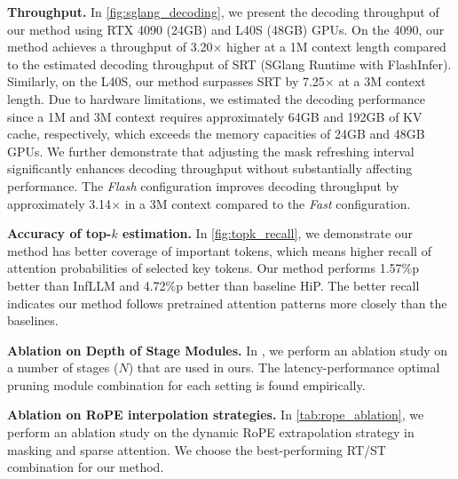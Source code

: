 \textbf{Throughput.} In \cref{fig:sglang_decoding}, we present the decoding throughput of our method using RTX 4090 (24GB) and L40S (48GB) GPUs. On the 4090, our method achieves a throughput of 3.20$\times$ higher at a 1M context length compared to the estimated decoding throughput of SRT (SGlang Runtime with FlashInfer). Similarly, on the L40S, our method surpasses SRT by 7.25$\times$ at a 3M context length.
Due to hardware limitations, we estimated the decoding performance since a 1M and 3M context requires approximately 64GB and 192GB of KV cache, respectively, which exceeds the memory capacities of 24GB and 48GB GPUs.
We further demonstrate that adjusting the mask refreshing interval significantly enhances decoding throughput without substantially affecting performance. The \textit{Flash} configuration improves decoding throughput by approximately 3.14$\times$ in a 3M context compared to the \textit{Fast} configuration.


\textbf{Accuracy of top-$k$ estimation.}
In \cref{fig:topk_recall}, we demonstrate our method has better coverage of important tokens, which means higher recall of attention probabilities of selected key tokens. 
Our method performs 1.57\%p better than InfLLM and 4.72\%p better than baseline HiP.
The better recall indicates our method follows pretrained attention patterns more closely than the baselines. 

%
\textbf{Ablation on Depth of Stage Modules.}
In , we perform an ablation study on a number of stages ($N$) that are used in ours. The latency-performance optimal pruning module combination for each setting is found empirically.


\textbf{Ablation on RoPE interpolation strategies.}
In \cref{tab:rope_ablation}, we perform an ablation study on the dynamic RoPE extrapolation strategy in masking and sparse attention.
We choose the best-performing RT/ST combination for our method.